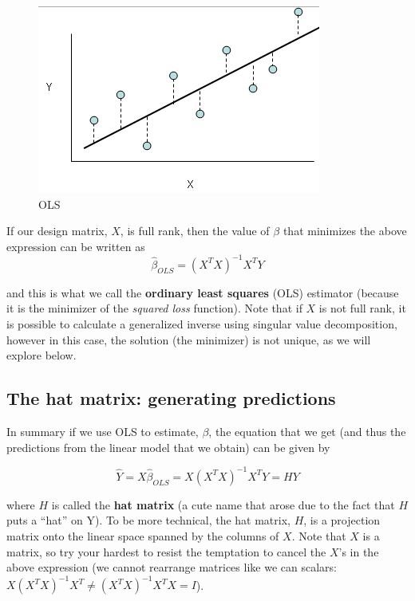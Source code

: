 \begin{figure}[H]
\begin{center}
\includegraphics[scale=0.8]{OLS.png}
\end{center}
\caption{OLS}
\label{fig:ols}
\end{figure}

If our design matrix, $X$, is full rank, then the value of $\beta$ that minimizes the above expression can be written as 
$$\hat{\beta}_{OLS} = \left(X^TX\right)^{-1}X^T Y $$

and this is what we call the {\bf ordinary least squares} (OLS) estimator (because it is the minimizer of the \textit{squared loss} function). Note that if $X$ is not full rank, it is possible to calculate a generalized inverse using singular value decomposition, however in this case, the solution (the minimizer) is not unique, as we will explore below. 


\subsection*{The hat matrix: generating predictions}

In summary if we use OLS to estimate, $\beta$, the equation that we get (and thus the predictions from the linear model that we obtain) can be given by

$$\hat{Y} = X\hat{\beta}_{OLS} = X\left(X^TX\right)^{-1}X^TY = HY$$

where $H$ is called the {\bf hat matrix} (a cute name that arose due to the fact that $H$ puts a ``hat'' on Y). To be more technical, the hat matrix, $H$, is a projection matrix onto the linear space spanned by the columns of $X$. Note that $X$ is a matrix, so try your hardest to resist the temptation to cancel the $X$'s in the above expression (we cannot rearrange matrices like we can scalars: $ X\left(X^TX\right)^{-1}X^T \neq  \left(X^TX\right)^{-1}X^TX = I$).


